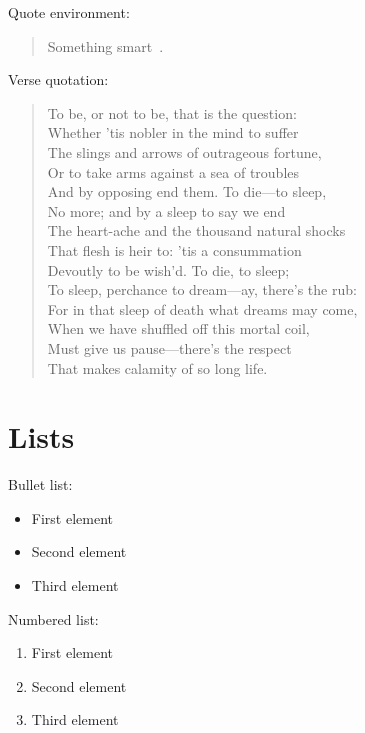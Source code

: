 Quote environment:

\begin{quote}
Something smart~\cite{hodgkin1952quantitative}.
\end{quote}

\normalsize
Verse quotation:

\small
\begin{verse}
To be, or not to be, that is the question:\\
Whether 'tis nobler in the mind to suffer\\
The slings and arrows of outrageous fortune,\\
Or to take arms against a sea of troubles\\
And by opposing end them. To die—to sleep,\\
No more; and by a sleep to say we end\\
The heart-ache and the thousand natural shocks\\
That flesh is heir to: 'tis a consummation\\
Devoutly to be wish'd. To die, to sleep;\\
To sleep, perchance to dream—ay, there's the rub:\\
For in that sleep of death what dreams may come,\\
When we have shuffled off this mortal coil,\\
Must give us pause—there's the respect\\
That makes calamity of so long life.~\cite{thebard}\\
\end{verse}
\normalsize

\section{Lists}

Bullet list:
\begin{itemize}
\item First element 
\item Second element
\item Third element
\end{itemize}

Numbered list:
\begin{enumerate}
\item First element
\item Second element
\item Third element
\end{enumerate}

